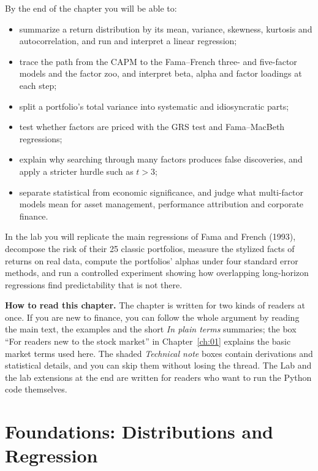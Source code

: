 By the end of the chapter you will be able to:
\begin{itemize}
  \item summarize a return distribution by its mean, variance, skewness, kurtosis and autocorrelation, and run and interpret a linear regression;
  \item trace the path from the CAPM to the Fama--French three- and five-factor models and the factor zoo, and interpret beta, alpha and factor loadings at each step;
  \item split a portfolio's total variance into systematic and idiosyncratic parts;
  \item test whether factors are priced with the GRS test and Fama--MacBeth regressions;
  \item explain why searching through many factors produces false discoveries, and apply a stricter hurdle such as $t > 3$;
  \item separate statistical from economic significance, and judge what multi-factor models mean for asset management, performance attribution and corporate finance.
\end{itemize}

In the lab you will replicate the main regressions of Fama and French (1993), decompose the risk of their 25 classic portfolios, measure the stylized facts of returns on real data, compute the portfolios' alphas under four standard error methods, and run a controlled experiment showing how overlapping long-horizon regressions find predictability that is not there.

\begin{callout}
\textbf{How to read this chapter.} The chapter is written for two kinds of readers at once. If you are new to finance, you can follow the whole argument by reading the main text, the examples and the short \emph{In plain terms} summaries; the box ``For readers new to the stock market'' in Chapter~\ref{ch:01} explains the basic market terms used here. The shaded \emph{Technical note} boxes contain derivations and statistical details, and you can skip them without losing the thread. The Lab and the lab extensions at the end are written for readers who want to run the Python code themselves.
\end{callout}

\section{Foundations: Distributions and Regression}
\label{sec:04-foundations}

